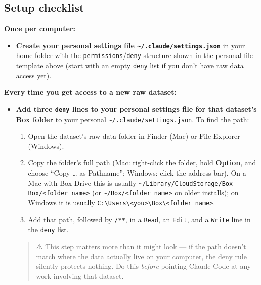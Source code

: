 \documentclass[
]{book}
\providecommand{\tightlist}{%
  \setlength{\itemsep}{0pt}\setlength{\parskip}{0pt}}
\begin{document}
\subsection{Setup checklist}\label{setup-checklist}

\textbf{Once per computer:}

\begin{itemize}
\tightlist
\item[$\square$]
  \textbf{Create your personal settings file \texttt{\textasciitilde{}/.claude/settings.json}} in your home folder with the
  \texttt{permissions}/\texttt{deny} structure shown in the personal-file template
  above (start with an empty \texttt{deny} list if you don't have raw data
  access yet).
\end{itemize}

\textbf{Every time you get access to a new raw dataset:}

\begin{itemize}
\item[$\square$]
  \textbf{Add three \texttt{deny} lines to your personal settings file for that dataset's Box folder} to your
  personal \texttt{\textasciitilde{}/.claude/settings.json}. To find the path:

  \begin{enumerate}
  \def\labelenumi{\arabic{enumi}.}
  \tightlist
  \item
    Open the dataset's raw-data folder in Finder (Mac) or File
    Explorer (Windows).
  \item
    Copy the folder's full path (Mac: right-click the folder, hold
    \textbf{Option}, and choose ``Copy \ldots{} as Pathname''; Windows: click the
    address bar). On a Mac with Box Drive this is usually
    \texttt{\textasciitilde{}/Library/CloudStorage/Box-Box/\textless{}folder\ name\textgreater{}} (or \texttt{\textasciitilde{}/Box/\textless{}folder\ name\textgreater{}} on older installs); on Windows it is usually
    \texttt{C:\textbackslash{}Users\textbackslash{}\textless{}you\textgreater{}\textbackslash{}Box\textbackslash{}\textless{}folder\ name\textgreater{}}.
  \item
    Add that path, followed by \texttt{/**}, in a \texttt{Read}, an \texttt{Edit}, and a
    \texttt{Write} line in the \texttt{deny} list.
  \end{enumerate}

  \begin{quote}
  ⚠️ This step matters more than it might look --- if the path doesn't
  match where the data actually live on your computer, the deny rule
  silently protects nothing. Do this \emph{before} pointing Claude Code at
  any work involving that dataset.
  \end{quote}
\end{itemize}
\end{document}
